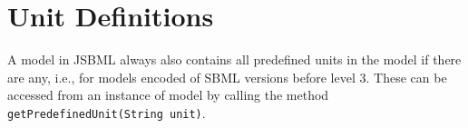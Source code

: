 \documentclass[
  letterpaper,
  11pt,
  headsepline,
  pointlessnumbers,
  tablecaptionabove,
  headinclude,
  appendixprefix,
  idxtotoc,
  bibtotoc
]{scrartcl}
\begin{document}
\section{Unit Definitions}

A model in JSBML always also contains all predefined units in the model
if there are any, i.e., for models encoded of SBML versions before level
3. These can be accessed from an instance of model by calling the method
\verb!getPredefinedUnit(String unit)!.


% 
% 
\end{document}

